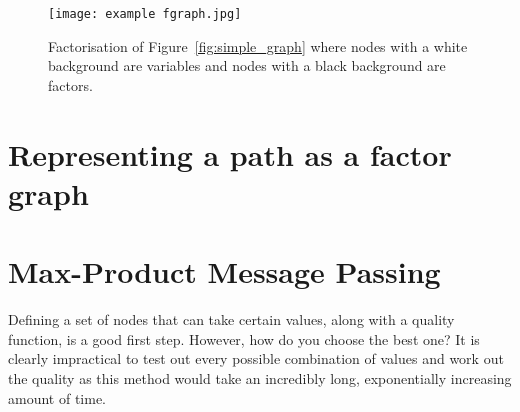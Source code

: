 \begin{figure}[h]
    \centering
    \texttt{[image: example fgraph.jpg]}
    \caption{Factorisation of Figure~\ref{fig:simple_graph} where nodes with a white background are variables and nodes with a black background are factors.}
    \label{fig:simple_fgraph}
\end{figure}

\section{Representing a path as a factor graph}
\label{sec:path_as_fg}


\section{Max-Product Message Passing}
\label{sec:mpmp}
Defining a set of nodes that can take certain values, along with a quality function, is a good first step.
However, how do you choose the best one?
It is clearly impractical to test out every possible combination of values and work out the quality as this method would take an incredibly long, exponentially increasing amount of time.
